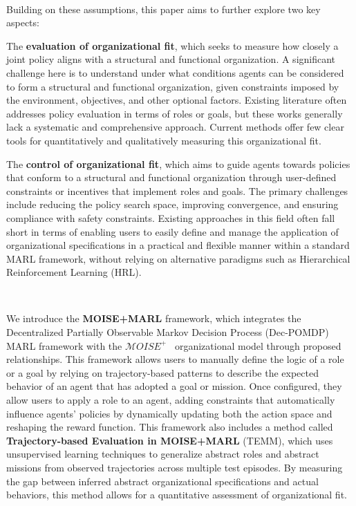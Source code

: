 \documentclass[sigconf,anonymous]{aamas}
\begin{document}
\

Building on these assumptions, this paper aims to further explore two key aspects:
\begin{enumerate*}[label={\roman*)}]
    \item The \textbf{evaluation of organizational fit}, which seeks to measure how closely a joint policy aligns with a structural and functional organization. A significant challenge here is to understand under what conditions agents can be considered to form a structural and functional organization, given constraints imposed by the environment, objectives, and other optional factors.
    Existing literature often addresses policy evaluation in terms of roles or goals, but these works generally lack a systematic and comprehensive approach. Current methods offer few clear tools for quantitatively and qualitatively measuring this organizational fit.
    \item The \textbf{control of organizational fit}, which aims to guide agents towards policies that conform to a structural and functional organization through user-defined constraints or incentives that implement roles and goals.
    The primary challenges include reducing the policy search space, improving convergence, and ensuring compliance with safety constraints.
    Existing approaches in this field often fall short in terms of enabling users to easily define and manage the application of organizational specifications in a practical and flexible manner within a standard MARL framework, without relying on alternative paradigms such as Hierarchical Reinforcement Learning (HRL).
\end{enumerate*}

\

\noindent We introduce the \textbf{MOISE+MARL} framework, which integrates the Decentralized Partially Observable Markov Decision Process (Dec-POMDP) MARL framework with the $\mathcal{M}OISE^+$~\cite{Hubner2007} organizational model through proposed relationships. This framework allows users to manually define the logic of a role or a goal by relying on trajectory-based patterns to describe the expected behavior of an agent that has adopted a goal or mission. Once configured, they allow users to apply a role to an agent, adding constraints that automatically influence agents' policies by dynamically updating both the action space and reshaping the reward function. This framework also includes a method called \textbf{Trajectory-based Evaluation in MOISE+MARL} (TEMM), which uses unsupervised learning techniques to generalize abstract roles and abstract missions from observed trajectories across multiple test episodes. By measuring the gap between inferred abstract organizational specifications and actual behaviors, this method allows for a quantitative assessment of organizational fit.
\end{document}
